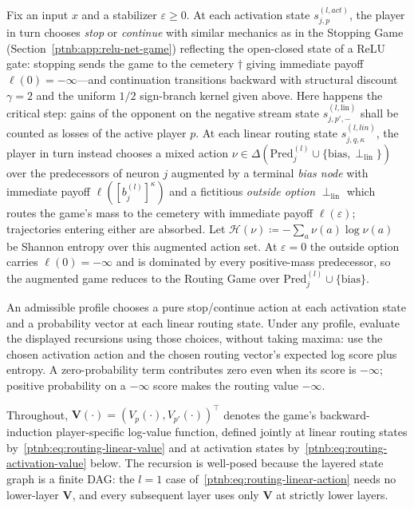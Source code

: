\begin{definition}\label{ptnb:def:routing-recursion}
Fix an input $x$ and a stabilizer $\varepsilon \ge 0$. At each activation state $s_{j,p}^{(l,
    act)}$, the player in turn chooses \emph{stop} or \emph{continue} with similar mechanics as in the
Stopping Game (Section~\ref{ptnb:app:relu-net-game}) reflecting the open-closed state of a ReLU gate:
stopping sends the game to the cemetery $\dagger$ giving immediate payoff $\ell(0) = -\infty$---and
continuation transitions backward with structural discount $\gamma=2$ and the uniform $1/2$
sign-branch kernel given above. Here happens the critical step: gains of the opponent on the
negative stream state $s_{j,p',-}^{(l, \text{lin})}$ shall be counted as losses of the active
player $p$. At each linear routing state $s_{j,q,\kappa}^{(l, lin)}$, the player in turn instead
chooses a mixed action $\nu \in \Delta(\mathrm{Pred}_j^{(l)} \cup \{\mathrm{bias},
    \perp_{\mathrm{lin}}\})$ over the predecessors of neuron $j$ augmented by a terminal \emph{bias
node} with immediate payoff $\ell([b_j^{(l)}]^\kappa)$ and a fictitious \emph{outside option}
$\perp_{\mathrm{lin}}$ which routes the game's mass to the cemetery with immediate payoff $\ell
    (\varepsilon)$; trajectories entering either are absorbed. Let $\mathcal{H}(\nu) \coloneqq
    -\sum_{a} \nu(a)\log \nu(a)$ be Shannon entropy over this augmented action set. At $\varepsilon =
    0$ the outside option carries $\ell (0) = -\infty$ and is dominated by every positive-mass
predecessor, so the augmented game reduces to the Routing Game over $\mathrm{Pred}_j^{(l)} \cup
    \{\mathrm{bias}\}$.

An admissible profile chooses a pure stop/continue action at each activation state and a probability vector at each linear routing state. Under any profile, evaluate the displayed recursions using those choices, without taking maxima: use the chosen activation action and the chosen routing vector's expected log score plus entropy. A zero-probability term contributes zero even when its score is $-\infty$; positive probability on a $-\infty$ score makes the routing value $-\infty$.

Throughout, $\mathbf{V}(\cdot) = (V_p(\cdot), V_{p'}(\cdot))^\top$ denotes the game's
backward-induction player-specific log-value function, defined jointly at linear routing states
by~\eqref{ptnb:eq:routing-linear-value} and at activation states by~\eqref{ptnb:eq:routing-activation-value}
below. The recursion is well-posed because the layered state graph is a finite DAG: the $l=1$ case
of~\eqref{ptnb:eq:routing-linear-action} needs no lower-layer $\mathbf{V}$, and every subsequent layer
uses only $\mathbf{V}$ at strictly lower layers.


\end{definition}
